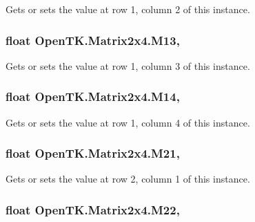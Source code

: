 Gets or sets the value at row 1, column 2 of this instance. 

\hypertarget{struct_open_t_k_1_1_matrix2x4_afeadbb3dd16162e2959116d538041130}{
\subsubsection[{M13}]{\setlength{\rightskip}{0pt plus 5cm}float Open\-T\-K.\-Matrix2x4.\-M13\hspace{0.3cm}{\ttfamily [get]}, {\ttfamily [set]}}}\label{struct_open_t_k_1_1_matrix2x4_afeadbb3dd16162e2959116d538041130}


Gets or sets the value at row 1, column 3 of this instance. 

\hypertarget{struct_open_t_k_1_1_matrix2x4_a5987f9d4b386602286edc35807e855aa}{
\subsubsection[{M14}]{\setlength{\rightskip}{0pt plus 5cm}float Open\-T\-K.\-Matrix2x4.\-M14\hspace{0.3cm}{\ttfamily [get]}, {\ttfamily [set]}}}\label{struct_open_t_k_1_1_matrix2x4_a5987f9d4b386602286edc35807e855aa}


Gets or sets the value at row 1, column 4 of this instance. 

\hypertarget{struct_open_t_k_1_1_matrix2x4_a280ba9bb57a408885c699a2ec1e38357}{
\subsubsection[{M21}]{\setlength{\rightskip}{0pt plus 5cm}float Open\-T\-K.\-Matrix2x4.\-M21\hspace{0.3cm}{\ttfamily [get]}, {\ttfamily [set]}}}\label{struct_open_t_k_1_1_matrix2x4_a280ba9bb57a408885c699a2ec1e38357}


Gets or sets the value at row 2, column 1 of this instance. 

\hypertarget{struct_open_t_k_1_1_matrix2x4_acaf2e338dad35266c8c61ca9f8bd4695}{
\subsubsection[{M22}]{\setlength{\rightskip}{0pt plus 5cm}float Open\-T\-K.\-Matrix2x4.\-M22\hspace{0.3cm}{\ttfamily [get]}, {\ttfamily [set]}}}\label{struct_open_t_k_1_1_matrix2x4_acaf2e338dad35266c8c61ca9f8bd4695}


